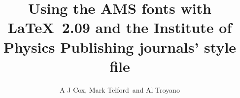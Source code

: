 %

\title{Using the AMS fonts with \LaTeX\ 2.09 and the Institute of Physics
Publishing journals' style 
file}


\author{A J Cox\dag, Mark Telford\ddag\ and Al Troyano\ddag}

\address{\dag\ Electronic Production Manager, Institute of Physics 
Publishing, Techno 
House, Redcliffe Way, Bristol BS1 6NX, UK}

\address{\ddag\ Production Department, Institute of Physics Publishing, 
Techno House, 
Redcliffe Way, Bristol BS1 6NX, UK}

